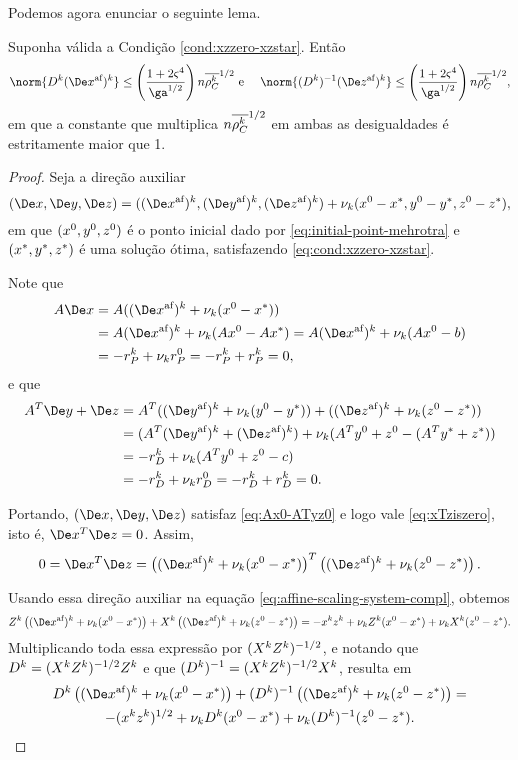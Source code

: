 Podemos agora enunciar o seguinte lema.
\begin{lema}\label{lemma:boundDxDzaff}
Suponha válida a Condição  \ref{cond:xzzero-xzstar}. Então 
	\begin{equation}
		\norm{\Dk  \dekx }\leq \left(\frac{1 + 2\bdxzstar^{4} }{\ga^{1/2}}\right) n\rhoCkb ^{1/2}\text{ e } \quad  \norm{\Dik  \dekz  }\leq \left(\frac{1 + 2\bdxzstar^{4} }{\ga^{1/2}}\right)n\rhoCkb ^{1/2},
		\end{equation}
em que a constante que multiplica $n\overline{\rho_C^{k}} ^{1/2}$ em ambas as desigualdades é estritamente maior que \num{1}.
\end{lema}
\begin{proof}
	Seja a direção  auxiliar
	\[
		(\Dex,\Dey,\Dez)  = ( \dekx,  \deky  ,  \dekz  ) + \nuk (\xzero - \xstar,\yzero - \ystar,\zzero - \zstar), 
	\]
em que $(x^0,y^0,z^0)$ é o ponto inicial dado por \eqref{eq:initial-point-mehrotra} e  $(x^*,y^*,z^*)$ é uma  solução ótima, satisfazendo \eqref{eq:cond:xzzero-xzstar}.
	
	Note que 
\[
\begin{aligned}
A\Dex & = A( \dekx + \nuk (\xzero - \xstar)) \\
& =  A\dekx + \nuk (A\xzero - A\xstar)  =  A\dekx + \nuk (A\xzero - b)\\
& = -r_{P}^{k}  + \nuk  r_{P}^{0}   = -r_{P}^{k} + r_{P}^{k} = 0,  
\end{aligned}
\]
e que
\[
\begin{aligned}
A^{T}\Dey + \Dez  & = 	A^{T}(\deky + \nuk (\yzero - \ystar)) + (\dekz + \nuk (\zzero - \zstar)) \\
							& = 	(A^{T}\deky  + \dekz) + \nuk (A^{T}\yzero  + \zzero  - (A^{T}\ystar +  \zstar)) \\
							& = 	- r_{D}^{k} + \nuk (A^{T}\yzero  + \zzero  - c) \\
							& = - r_{D}^{k}  + \nuk  r_{D}^{0}   = -r_{D}^{k} + r_{D}^{k} = 0.   
\end{aligned}
\]


Portando, $(\Dex,\Dey,\Dez)$  satisfaz \eqref{eq:Ax0-ATyz0} e logo vale \eqref{eq:xTziszero}, isto é, $\Dex^{T}\Dez = 0$. Assim, 
	\begin{equation}
		\label{eq:DxDzaff1}
			 0 = \Dex^{T}\Dez = \left( \dekx +  \nuk (\xzero - \xstar)\right)^{T}\left(  \dekz   +  \nuk (\zzero - \zstar)\right).
	\end{equation}
	

	 Usando essa direção auxiliar na equação \eqref{eq:affine-scaling-system-compl}, obtemos 
	 \[
	 \Zk\left( \dekx +  \nuk (\xzero - \xstar)\right)+ \Xk \left(  \dekz   +  \nuk (\zzero - \zstar)\right) = -\xk\zk + \nuk  \Zk(\xzero - \xstar) + \nuk  \Xk(\zzero - \zstar).
	 \]
	 Multiplicando toda essa expressão por $(X^{k}Z^{k})^{-1/2}$, e notando que $D^{k}=(X^{k}Z^{k})^{-1/2}Z^{k}$ e que $(D^{k})^{-1}=(X^{k}Z^{k})^{-1/2}X^{k}$, resulta em 
	\begin{multline}
		\label{eq:DxDzaff2}
		 \Dk\left( \dekx  +  \nuk (\xzero - \xstar)\right)+ \Dik \left(  \dekz   +  \nuk (\zzero - \zstar)\right) = \\ -(\xk\zk)^{1/2} + \nuk  \Dk(\xzero - \xstar) + \nuk  \Dik(\zzero - \zstar).
		\end{multline}
	 

\end{proof}
